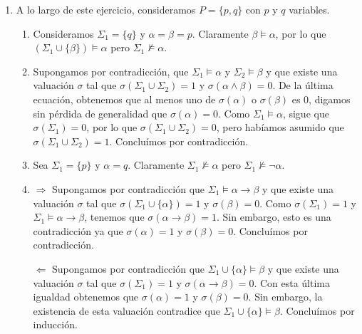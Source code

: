 \begin{enumerate}
    \item A lo largo de este ejercicio, consideramos $P=\{p,q\}$ con $p$ y $q$ variables.
    \begin{enumerate}
        \item {} Consideramos $\Sigma_1=\{q\}$ y $\alpha=\beta=p$. Claramente $\beta \models \alpha$, por lo que $(\Sigma_1\cup\{\beta\})\models \alpha$ pero $\Sigma_1\not\models \alpha$.
        \item {} Supongamos por contradicción, que $\Sigma_1\models \alpha$ y $\Sigma_2\models \beta$ y que existe una valuación $\sigma$ tal que $\sigma (\Sigma_1\cup \Sigma_2)=1$ y $\sigma(\alpha \land \beta)=0$. De la última ecuación, obtenemos que al menos uno de $\sigma(\alpha)$ o $\sigma(\beta)$ es 0, digamos sin pérdida de generalidad que $\sigma(\alpha)=0$. Como $\Sigma_1\models \alpha$, sigue que $\sigma(\Sigma_1)=0$, por lo que $\sigma (\Sigma_1\cup \Sigma_2)=0$, pero habíamos asumido que $\sigma (\Sigma_1\cup \Sigma_2)=1$. Concluímos por contradicción.
        \item {} Sea $\Sigma_1 = \{p\}$ y $\alpha=q$. Claramente $\Sigma_1 \not\models \alpha$ pero $\Sigma_1 \not\models \neg\alpha$.
        \item {} 
        
        \underline{$\Longrightarrow$} Supongamos por contradicción que $\Sigma_1 \models \alpha \to \beta$ y que existe una valuación $\sigma$ tal que $\sigma(\Sigma_1 \cup \{\alpha\})=1$ y $\sigma(\beta)=0$. Como $\sigma(\Sigma_1)=1$ y $\Sigma_1 \models \alpha \to \beta$, tenemos que $\sigma(\alpha \to \beta)=1$. Sin embargo, esto es una contradicción ya que $\sigma(\alpha)=1$ y $\sigma(\beta)=0$. Concluímos por contradicción.

        \underline{$\Longleftarrow$} Supongamos por contradicción que $\Sigma_1 \cup \{\alpha\}\models \beta$ y que existe una valuación $\sigma$ tal que $\sigma(\Sigma_1)=1$ y $\sigma(\alpha \to \beta)=0$. Con esta última igualdad obtenemos que $\sigma(\alpha)=1$ y $\sigma(\beta)=0$. Sin embargo, la existencia de esta valuación contradice que $\Sigma_1 \cup \{\alpha\}\models \beta$. Concluímos por inducción.
    \end{enumerate}
\end{enumerate}